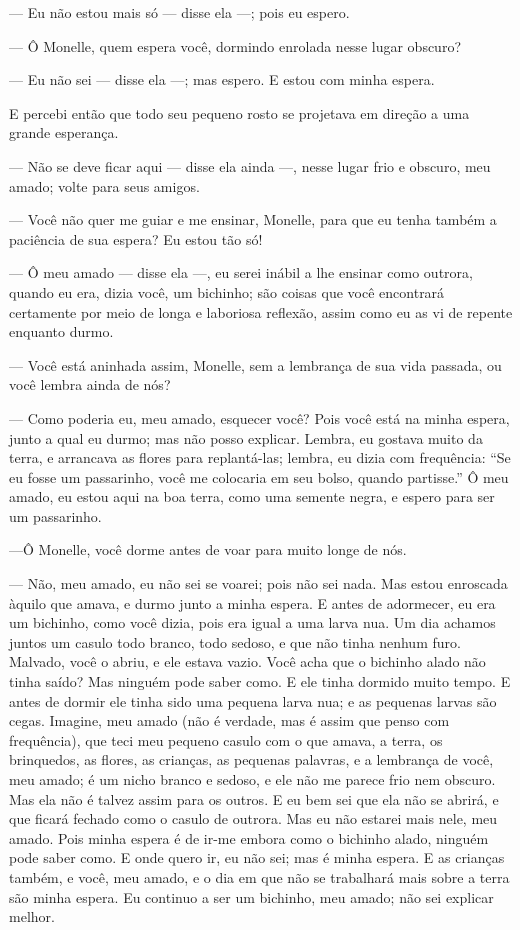 --- Eu não estou mais só --- disse ela ---; pois eu espero.

--- Ô Monelle, quem espera você, dormindo enrolada nesse lugar obscuro?

--- Eu não sei --- disse ela ---; mas espero. E estou com minha espera.

E percebi então que todo seu pequeno rosto se projetava em direção
a uma grande esperança.

--- Não se deve ficar aqui --- disse ela ainda ---, nesse lugar frio e obscuro,
meu amado; volte para seus amigos.

--- Você não quer me guiar e me ensinar, Monelle, para que eu tenha
também a paciência de sua espera? Eu estou tão só!

--- Ô meu amado --- disse ela ---, eu serei inábil a lhe ensinar como outrora,
quando eu era, dizia você, um bichinho; são coisas que você encontrará
certamente por meio de longa e laboriosa reflexão, assim como eu as vi de
repente enquanto durmo.

--- Você está aninhada assim, Monelle, sem a lembrança de sua vida
passada, ou você lembra ainda de nós?

--- Como poderia eu, meu amado, esquecer você? Pois você está na minha
espera, junto a qual eu durmo; mas não posso explicar. Lembra, eu gostava
muito da terra, e arrancava as flores para replantá-las; lembra, eu dizia
com frequência: “Se eu fosse um passarinho, você me colocaria em seu
bolso, quando partisse.” Ô meu amado, eu estou aqui na boa terra, como uma
semente negra, e espero para ser um passarinho.

---Ô Monelle, você dorme antes de voar para muito longe de nós.

--- Não, meu amado, eu não sei se voarei; pois não sei nada. Mas estou
enroscada àquilo que amava, e durmo junto a minha espera. E antes de
adormecer, eu era um bichinho, como você dizia, pois era igual a uma larva
nua. Um dia achamos juntos um casulo todo branco, todo sedoso, e que não
tinha nenhum furo. Malvado, você o abriu, e ele estava vazio. Você acha
que o bichinho alado não tinha saído? Mas ninguém pode saber como. E ele
tinha dormido muito tempo. E antes de dormir ele tinha sido uma pequena
larva nua; e as pequenas larvas são cegas. Imagine, meu amado (não é
verdade, mas é assim que penso com frequência), que teci meu pequeno
casulo com o que amava, a terra, os brinquedos, as flores, as crianças, as
pequenas palavras, e a lembrança de você, meu amado; é um nicho branco e
sedoso, e ele não me parece frio nem obscuro. Mas ela não é talvez assim
para os outros. E eu bem sei que ela não se abrirá, e que ficará fechado
como o casulo de outrora. Mas eu não estarei mais nele, meu amado. Pois
minha espera é de ir-me embora como o bichinho alado, ninguém pode saber
como. E onde quero ir, eu não sei; mas é minha espera. E as crianças
também, e você, meu amado, e o dia em que não se trabalhará mais sobre a
terra são minha espera. Eu continuo a ser um bichinho, meu amado; não sei
explicar melhor.

